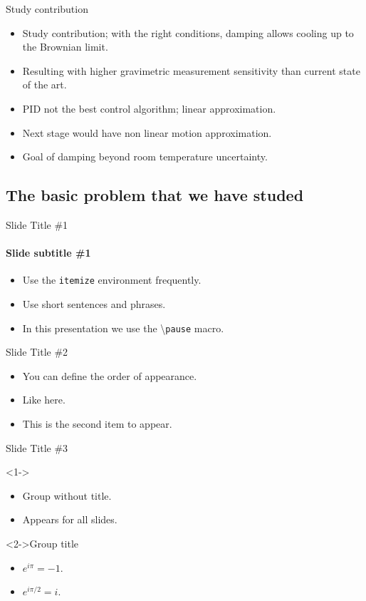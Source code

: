\documentclass{beamer}
\begin{document}
\begin{frame}{Study contribution}
	\begin{itemize}
		
		\item Study contribution; with the right conditions, damping allows cooling up to the Brownian limit. 
		\item Resulting with higher gravimetric measurement sensitivity than current state of the art.
		\pause
		\item PID not the best control algorithm; linear approximation. 
		\item Next stage would have non linear motion approximation.
		\item Goal of damping beyond room temperature uncertainty. 
	\end{itemize}
\end{frame}


\iffalse

\subsection[Basic Problem]{The basic problem that we have studed}

\begin{frame}{Slide Title \#1}
	\framesubtitle{Slide subtitle \#1}
	\begin{itemize}
		\item Use the \texttt{itemize} environment frequently.
		\pause
		\item Use short sentences and phrases.
		\pause
		\item In this presentation we use the \textbackslash{}\texttt{pause} macro.
	\end{itemize}
\end{frame}

\begin{frame}{Slide Title \#2}
	\begin{itemize}
		\item <1->You can define the order of appearance.
		\item <3->Like here.
		\item <2->This is the second item to appear.
	\end{itemize}
\end{frame}

\begin{frame}{Slide Title \#3}
	\begin{block}
		<1->{}
		\begin{itemize}
			\item Group without title.
			\item Appears for all slides.
		\end{itemize}
	\end{block}
	\begin{exampleblock}
		<2->{Group title}
		\begin{itemize}
			\item $e^{i\pi}=-1$.
			\item $e^{i\pi/2}=i$.
		\end{itemize}
	\end{exampleblock}
\end{frame}
\end{document}
